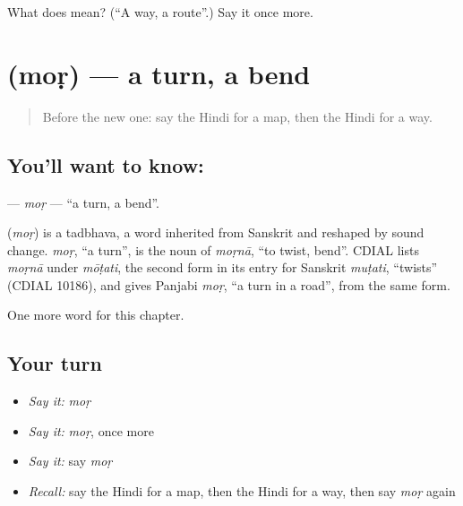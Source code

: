 \begin{tcolorbox}[breakable,colback=teal!4,colframe=teal!35!black,title={Before you move on}]
What does  mean? (\textquotedblleft{}A way, a route\textquotedblright{}.) Say it once more.
\end{tcolorbox}
\section[\texorpdfstring{\hi{मोड़} (moṛ)}{मोड़ (moṛ)}]{ (moṛ) — a turn, a bend}

\label{lesson:HI-C181-mor}



\begin{quote}
Before the new one: say the Hindi for a map, then the Hindi for a way.
\end{quote}

\subsection*{You'll want to know: }
\textbf{} — \emph{moṛ} — \textquotedblleft{}a turn, a bend\textquotedblright{}.

\begin{cousinweb}
\textbf{} (\emph{moṛ}) is a tadbhava, a word inherited from Sanskrit and reshaped by sound change. \emph{moṛ}, \textquotedblleft{}a turn\textquotedblright{}, is the noun of \emph{moṛnā}, \textquotedblleft{}to twist, bend\textquotedblright{}. CDIAL lists \emph{moṛnā} under \emph{mōṭati}, the second form in its entry for Sanskrit \emph{muṭati}, \textquotedblleft{}twists\textquotedblright{} (CDIAL 10186), and gives Panjabi \emph{moṛ}, \textquotedblleft{}a turn in a road\textquotedblright{}, from the same form.
\end{cousinweb}

\begin{grammarlens}[title={What you've built}]
One more word for this chapter.
\end{grammarlens}

\subsection*{Your turn}
\begin{itemize}
\raggedright
  \item \emph{Say it:} \emph{moṛ}
  \item \emph{Say it:} \emph{moṛ}, once more
  \item \emph{Say it:} say \emph{moṛ}
  \item \emph{Recall:} say the Hindi for a map, then the Hindi for a way, then say \emph{moṛ} again
\end{itemize}

